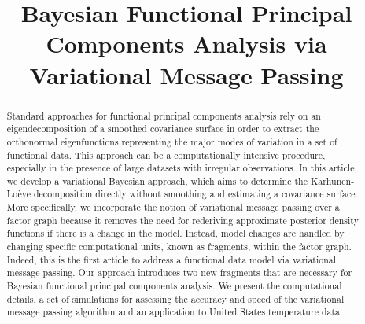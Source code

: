 \documentclass[ba]{imsart}
\numberwithin{equation}{section}
\theoremstyle{plain}
\begin{document}
\begin{frontmatter}
\title{Bayesian Functional Principal Components Analysis via Variational Message Passing}


\begin{abstract}
Standard approaches for functional principal components analysis
rely on an eigendecomposition of a smoothed covariance surface in order to extract the orthonormal eigenfunctions
representing the major modes of variation in a set of functional data.
This approach can be a computationally intensive procedure, especially
in the presence of large datasets with irregular observations. In this article, we develop a variational Bayesian approach,
which aims to determine the Karhunen-Lo\`{e}ve decomposition directly without smoothing and estimating a
covariance surface. More specifically, we incorporate the notion of variational message passing over a factor graph 
because it removes the need for rederiving approximate
posterior density functions if there is a change in the model. Instead, model changes are handled by changing
specific computational units, known as fragments, within the factor graph. 
Indeed, this is the first article to address a functional data model
via variational message passing. Our approach introduces two new fragments that are necessary for Bayesian
functional principal components analysis. We present the computational details, a set of simulations for assessing the
accuracy and speed of the variational message passing algorithm and an application to United States temperature data.
\end{abstract}


\end{frontmatter}
\end{document}
